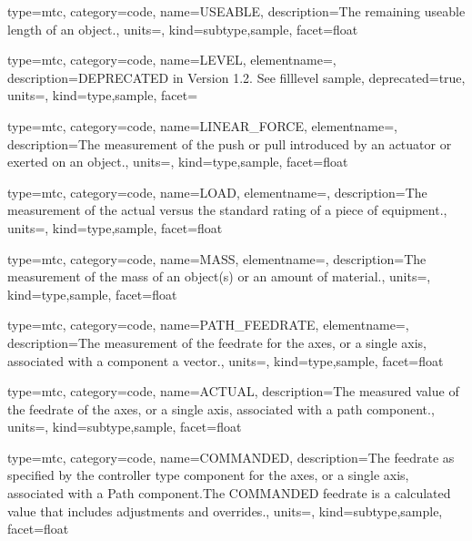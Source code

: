 {
  type=mtc,
  category=code,
  name={USEABLE},
  description={The remaining useable length of an object.},
  units=,
  kind={subtype,sample},
  facet={\gls{float}}
}


{
  type=mtc,
  category=code,
  name={LEVEL},
  elementname=,
  description={DEPRECATED in Version 1.2.  See \gls{filllevel sample}},
  deprecated={true},
  units={},
  kind={type,sample},
  facet={}
}


{
  type=mtc,
  category=code,
  name={LINEAR\_FORCE},
  elementname=,
  description={The measurement of the push or pull introduced by an actuator or exerted on an object.},
  units=,
  kind={type,sample},
  facet={\gls{float}}
}


{
  type=mtc,
  category=code,
  name={LOAD},
  elementname=,
  description={The measurement of the actual versus the standard rating of a piece of equipment.},
  units=,
  kind={type,sample},
  facet={\gls{float}}
}


{
  type=mtc,
  category=code,
  name={MASS},
  elementname=,
  description={The measurement of the mass of an object(s) or an amount of material.},
  units=,
  kind={type,sample},
  facet={\gls{float}}
}


{
  type=mtc,
  category=code,
  name={PATH\_FEEDRATE},
  elementname=,
  description={The measurement of the feedrate for the axes, or a single axis, associated with a  component a vector.},
  units=,
  kind={type,sample},
  facet={\gls{float}}
}


{
  type=mtc,
  category=code,
  name={ACTUAL},
  description={The measured value of the feedrate of the axes, or a single axis, associated with a path component.},
  units=,
  kind={subtype,sample},
  facet={\gls{float}}
}


{
  type=mtc,
  category=code,
  name={COMMANDED},
  description={The feedrate as specified by the \gls{controller} type component for the axes, or a single axis, associated with a Path component.The COMMANDED feedrate is a calculated value that includes adjustments and overrides.},
  units=,
  kind={subtype,sample},
  facet={\gls{float}}
}


